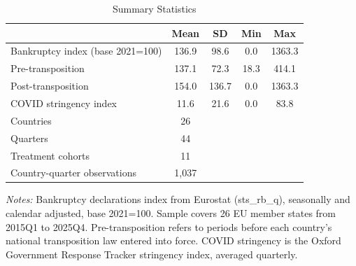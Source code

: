 \begin{table}[t]
\centering
\caption{Summary Statistics}
\label{tab:sumstats}
\begin{tabular}{lcccc}
\hline\hline
 & Mean & SD & Min & Max \\
\hline
Bankruptcy index (base 2021=100) & 136.9 & 98.6 & 0.0 & 1363.3 \\
\quad Pre-transposition & 137.1 & 72.3 & 18.3 & 414.1 \\
\quad Post-transposition & 154.0 & 136.7 & 0.0 & 1363.3 \\
COVID stringency index & 11.6 & 21.6 & 0.0 & 83.8 \\
\hline
Countries & 26 &  &  &  \\
Quarters & 44 &  &  &  \\
Treatment cohorts & 11 &  &  &  \\
Country-quarter observations & 1,037 &  &  &  \\
\hline\hline
\end{tabular}
\begin{minipage}{0.9\textwidth}
\vspace{0.3em}
\footnotesize \textit{Notes:} Bankruptcy declarations index from Eurostat (sts\_rb\_q), seasonally and calendar adjusted, base 2021=100. Sample covers 26 EU member states from 2015Q1 to 2025Q4. Pre-transposition refers to periods before each country's national transposition law entered into force. COVID stringency is the Oxford Government Response Tracker stringency index, averaged quarterly.
\end{minipage}
\end{table}
